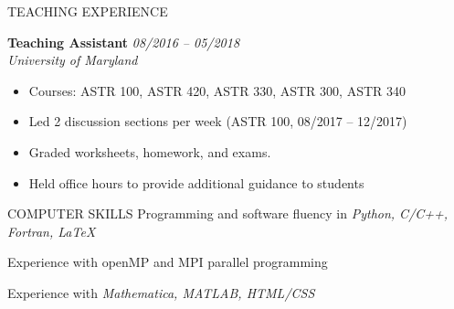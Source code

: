\documentclass[letterpaper]{resume} %
\begin{document}
\begin{rSection}{TEACHING EXPERIENCE} \itemsep -3pt
\renewcommand\labelitemi{\tiny$\bullet$}

{\bf Teaching Assistant} \hfill {\em 08/2016 -- 05/2018}\\
  \emph{University of Maryland}
  \begin{itemize}[noitemsep,topsep=-2pt]
  \item Courses: ASTR 100, ASTR 420, ASTR 330, ASTR 300, ASTR 340
  \item Led 2 discussion sections per week (ASTR 100, 08/2017 -- 12/2017) 
  \item Graded worksheets, homework, and exams.
  \item Held office hours to provide additional guidance to students
  \end{itemize}
\end{rSection}

\begin{rSection}{COMPUTER SKILLS}
Programming and software fluency in {\em Python, C/C++, Fortran, \LaTeX}
\item Experience with openMP and MPI parallel programming
\item Experience with {\em Mathematica, MATLAB, HTML/CSS}
\end{rSection}
\end{document}
